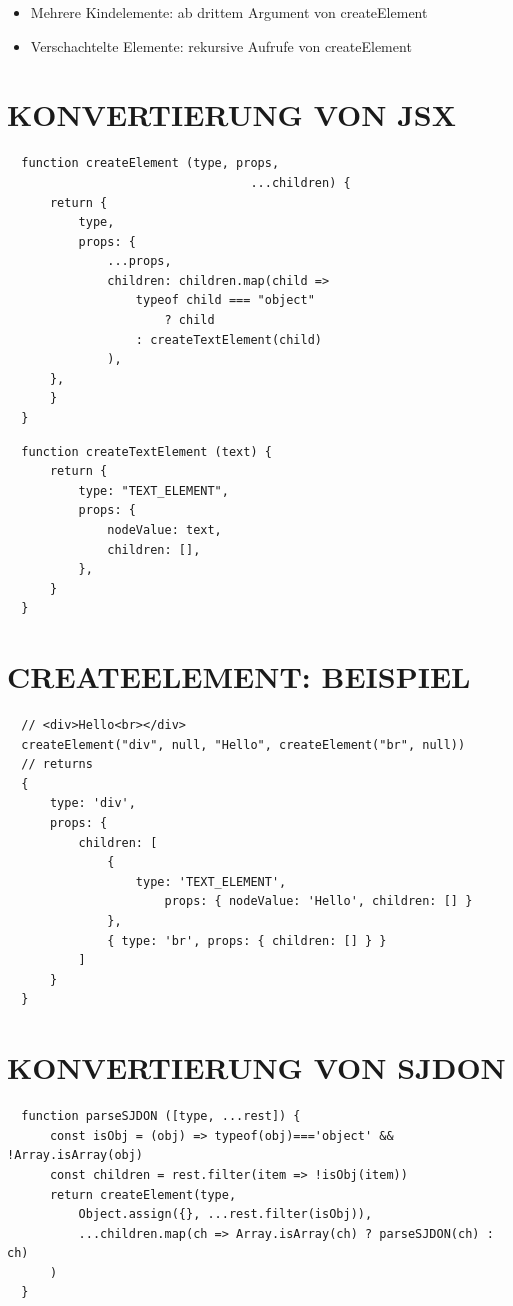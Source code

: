   \begin{itemize}
    \item Mehrere Kindelemente: ab drittem Argument von createElement
    \item Verschachtelte Elemente: rekursive Aufrufe von createElement
  \end{itemize}
  
  \section*{KONVERTIERUNG VON JSX}
  \begin{verbatim}
  function createElement (type, props,
                                  ...children) {
      return {
          type,
          props: {
              ...props,
              children: children.map(child =>
                  typeof child === "object"
                      ? child
                  : createTextElement(child)
              ),
      },
      }
  }
  \end{verbatim}
  
  \begin{verbatim}
  function createTextElement (text) {
      return {
          type: "TEXT_ELEMENT",
          props: {
              nodeValue: text,
              children: [],
          },
      }
  }
  \end{verbatim}
  
  \section*{CREATEELEMENT: BEISPIEL}
  \begin{verbatim}
  // <div>Hello<br></div>
  createElement("div", null, "Hello", createElement("br", null))
  // returns
  {
      type: 'div',
      props: {
          children: [
              {
                  type: 'TEXT_ELEMENT',
                      props: { nodeValue: 'Hello', children: [] }
              },
              { type: 'br', props: { children: [] } }
          ]
      }
  }
  \end{verbatim}
  
  \section*{KONVERTIERUNG VON SJDON}
  \begin{verbatim}
  function parseSJDON ([type, ...rest]) {
      const isObj = (obj) => typeof(obj)==='object' && !Array.isArray(obj)
      const children = rest.filter(item => !isObj(item))
      return createElement(type,
          Object.assign({}, ...rest.filter(isObj)),
          ...children.map(ch => Array.isArray(ch) ? parseSJDON(ch) : ch)
      )
  }
  \end{verbatim}
  
